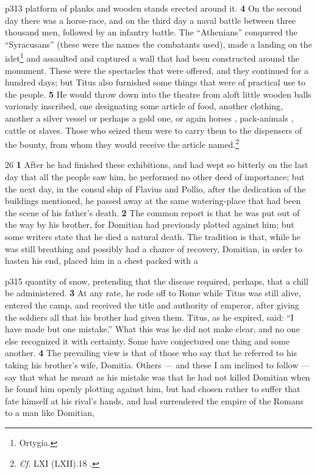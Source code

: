 p313 platform of planks and wooden stands erected around it. \textbf{4} On the second day there was a horse-race, and on the third day a naval battle between three thousand men, followed by an infantry battle. The ``Athenians'' conquered the ``Syracusans'' (these were the names the combatants used), made a landing on the islet\texthebrew{⁠}\footnote{Ortygia.

} and assaulted and captured a wall that had been constructed around the monument. These were the spectacles that were offered, and they continued for a hundred days; but Titus also furnished some things that were of practical use to the people. \textbf{5} He would throw down into the theatre from aloft little wooden balls variously inscribed, one designating some article of food, another clothing, another a silver vessel or perhaps a gold one, or again horses , pack-animals , cattle or slaves. Those who seized them were to carry them to the dispensers of the bounty, from whom they would receive the article named.\footnote{\emph{Cf.} LXI (LXII).18 .}

26
\textbf{1} After he had finished these exhibitions, and had wept so bitterly on the last day that all the people saw him, he performed no other deed of importance; but the next day, in the consul ­ship of Flavius and Pollio, after the dedication of the buildings mentioned, he passed away at the same watering-place that had been the scene of his father's death. \textbf{2} The common report is that he was put out of the way by his brother, for Domitian had previously plotted against him; but some writers state that he died a natural death. The tradition is that, while he was still breathing and possibly had a chance of recovery, Domitian, in order to hasten his end, placed him in a chest packed with a

p315 quantity of snow, pretending that the disease required, perhaps, that a chill be administered. \textbf{3} At any rate, he rode off to Rome while Titus was still alive, entered the camp, and received the title and authority of emperor, after giving the soldiers all that his brother had given them. Titus, as he expired, said: ``I have made but one mistake.'' What this was he did not make clear, and no one else recognized it with certainty. Some have conjectured one thing and some another. \textbf{4} The prevailing view is that of those who say that he referred to his taking his brother's wife, Domitia. Others \texthebrew{—} and these I am inclined to follow \texthebrew{—} say that what he meant as his mistake was that he had not killed Domitian when he found him openly plotting against him, but had chosen rather to suffer that fate himself at his rival's hands, and had surrendered the empire of the Romans to a man like Domitian,

